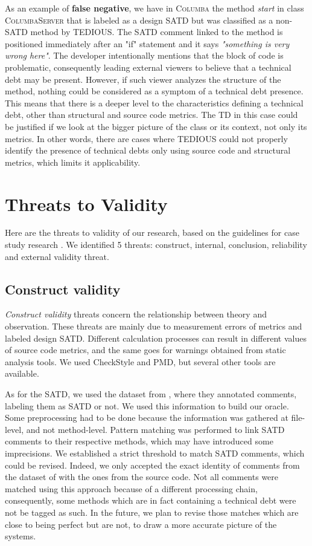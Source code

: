 As an example of \textbf{false negative}, we have in \textsc{Columba} the method \textit{start} in class \textsc{ColumbaServer} that is labeled as a design SATD but was classified as a non-SATD method by TEDIOUS. The SATD comment linked to the method is positioned immediately after an "if" statement and it says \textit{"something is very wrong here"}. The developer intentionally mentions that the block of code is problematic, consequently leading external viewers to believe that a technical debt may be present. However, if such viewer analyzes the structure of the method, nothing could be considered as a symptom of a technical debt presence. This means that there is a deeper level to the characteristics defining a technical debt, other than structural and source code metrics. The TD in this case could be justified if we look at the bigger picture of the class or its context, not only its metrics. In other words, there are cases where TEDIOUS could not properly identify the presence of technical debts only using source code and structural metrics, which limits it applicability.

\section{Threats to Validity}

Here are the threats to validity of our research, based on the guidelines for case study research \citep{yin2013case}. We identified 5 threats: construct, internal, conclusion, reliability and external validity threat.

\subsection{Construct validity}


\textit{Construct validity} threats concern the relationship between theory and observation. These threats are mainly due to measurement errors of metrics and labeled design SATD. Different calculation processes can result in different values of source code metrics, and the same goes for warnings obtained from static analysis tools. We used CheckStyle and PMD, but several other tools are available. 

As for the SATD, we used the dataset from \citet{maldonado17}, where they annotated comments, labeling them as SATD or not. We used this information to build our oracle. Some preprocessing had to be done because the information was gathered at file-level, and not method-level. Pattern matching was performed to link SATD comments to their respective methods, which may have introduced some imprecisions. We established a strict threshold to match SATD comments, which could be revised. Indeed, we only accepted the exact identity of comments from the dataset of \citet{maldonado17} with the ones from the source code. Not all comments were matched using this approach because of a different processing chain, consequently, some methods which are in fact containing a technical debt were not be tagged as such. In the future, we plan to revise those matches which are close to being perfect but are not, to draw a more accurate picture of the systems. 

